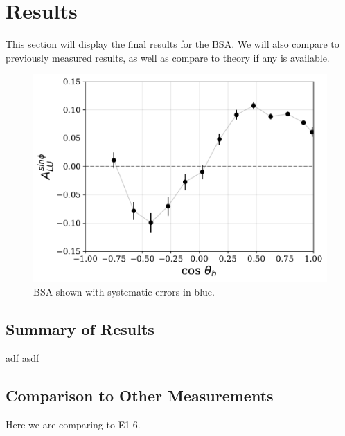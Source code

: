 \section{Results}
This section will display the final results for the BSA.  We will also compare to previously measured results, as well as compare to theory if any is available.


\begin{figure}
  \begin{center}
    \includegraphics[width=12cm]{image/default_bsa_integrated_sys.pdf}
    \caption{BSA shown with systematic errors in blue.}
  \end{center}
\end{figure}

\subsection{Summary of Results}
adf asdf

\subsection{Comparison to Other Measurements}

Here we are comparing to E1-6.

